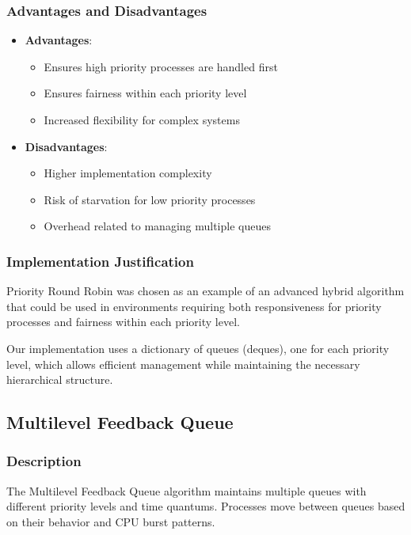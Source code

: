 \documentclass[12pt,a4paper]{article}
\begin{document}
\subsubsection{Advantages and Disadvantages}
\begin{itemize}
    \item \textbf{Advantages}:
    \begin{itemize}
        \item Ensures high priority processes are handled first
        \item Ensures fairness within each priority level
        \item Increased flexibility for complex systems
    \end{itemize}
    \item \textbf{Disadvantages}:
    \begin{itemize}
        \item Higher implementation complexity
        \item Risk of starvation for low priority processes
        \item Overhead related to managing multiple queues
    \end{itemize}
\end{itemize}

\subsubsection{Implementation Justification}
Priority Round Robin was chosen as an example of an advanced hybrid algorithm that could be used in environments requiring both responsiveness for priority processes and fairness within each priority level.

Our implementation uses a dictionary of queues (deques), one for each priority level, which allows efficient management while maintaining the necessary hierarchical structure.

\subsection{Multilevel Feedback Queue}
\subsubsection{Description}
The Multilevel Feedback Queue algorithm maintains multiple queues with different priority levels and time quantums. Processes move between queues based on their behavior and CPU burst patterns.
\end{document}
